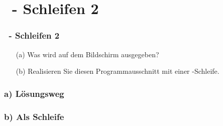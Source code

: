 \def\stitle{\theexercise\ - Schleifen 2}
\section{\stitle}
\begin{frame}[t]%
    \frametitle{\stitle}



\begin{itemize}
\item[(a)] Was wird auf dem Bildschirm ausgegeben?
\item[(b)] Realisieren Sie diesen Programmausschnitt mit einer -Schleife.
\end{itemize}
\end{frame}


\begin{frame}[fragile]%
 \frametitle{a) L\"osungsweg}%

\end{frame}


\begin{frame}[fragile]%
 \frametitle{b) Als  Schleife}%

\end{frame}

